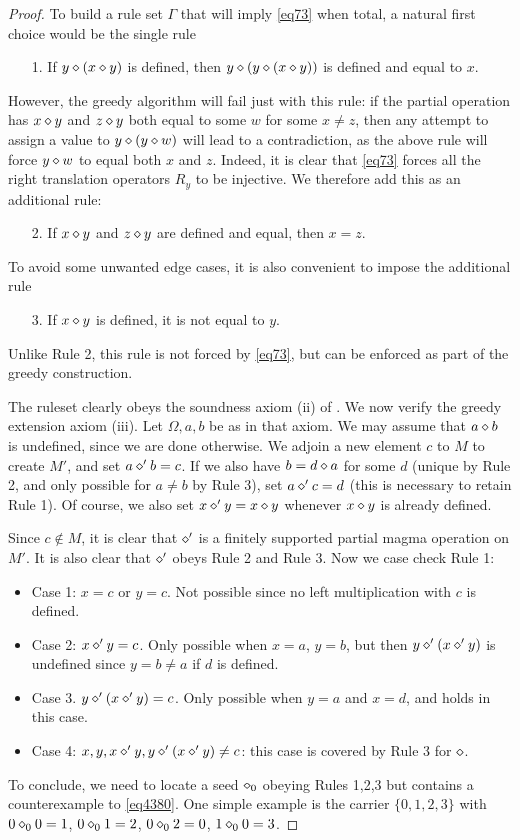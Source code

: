 \begin{proof} To build a rule set $\Gamma$ that will imply \eqref{eq73} when total, a natural first choice would be the single rule
\begin{itemize}
\item[1.] If $y \diamond (x \diamond y)$ is defined, then $y \diamond (y \diamond (x \diamond y))$ is defined and equal to $x$.
\end{itemize}
However, the greedy algorithm will fail just with this rule: if the partial operation has $x \diamond y$ and $z \diamond y$ both equal to some $w$ for some $x \neq z$, then any attempt to assign a value to $y \diamond (y \diamond w)$ will lead to a contradiction, as the above rule will force $y \diamond w$ to equal both $x$ and $z$.  Indeed, it is clear that \eqref{eq73} forces all the right translation operators $R_y$ to be injective.  We therefore add this as an additional rule:
\begin{itemize}
\item[2.] If $x \diamond y$ and $z \diamond y$ are defined and equal, then $x=z$.
\end{itemize}
To avoid some unwanted edge cases, it is also convenient to impose the additional rule
\begin{itemize}
  \item[3.] If $x \diamond y$ is defined, it is not equal to $y$.
\end{itemize}
Unlike Rule 2, this rule is not forced by \eqref{eq73}, but can be enforced as part of the greedy construction.

The ruleset clearly obeys the soundness axiom (ii) of .  We now verify the greedy extension axiom (iii).  Let $\Omega,a,b$ be as in that axiom. We may assume that $a \diamond b$ is undefined, since we are done otherwise. We adjoin a new element $c$ to $M$ to create $M'$, and set $a \diamond' b = c$.  If we also have $b = d \diamond a$ for some $d$ (unique by Rule 2, and only possible for $a \neq b$ by Rule 3), set $a \diamond' c = d$ (this is necessary to retain Rule 1).  Of course, we also set $x \diamond' y = x \diamond y$ whenever $x \diamond y$ is already defined.

Since $c \not \in M$, it is clear that $\diamond'$ is a finitely supported partial magma operation on $M'$.  It is also clear that $\diamond'$ obeys Rule 2 and Rule 3.   Now we case check Rule 1:
\begin{itemize}
\item Case 1: $x=c$ or $y=c$.  Not possible since no left multiplication with $c$ is defined.
\item Case 2: $x \diamond' y = c$.  Only possible when $x = a$, $y = b$, but then $y \diamond' (x \diamond' y)$ is undefined since $y = b \neq a$ if $d$ is defined.
\item Case 3. $y \diamond' (x \diamond' y) = c$.  Only possible when $y=a$ and $x=d$, and holds in this case.
\item Case 4: $x, y, x \diamond' y, y \diamond' (x \diamond' y) \neq c$: this case is covered by Rule 3 for $\diamond$.
\end{itemize}
To conclude, we need to locate a seed $\diamond_0$ obeying Rules 1,2,3 but contains a counterexample to \eqref{eq4380}.  One simple example is the carrier $\{0,1,2,3\}$ with $0 \diamond_0 0 = 1$, $0 \diamond_0 1 = 2$, $0 \diamond_0 2 = 0$, $1 \diamond_0 0 = 3$.
\end{proof}

